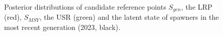 \documentclass[11pt]{book}
\begin{document}
\begin{figure}[htb]

{\centering {} 

}

\caption{Posterior distributions of candidate reference points \(S_{gen}\), the LRP (red), \(S_{MSY}\), the USR (green) and the latent state of spawners in the most recent generation (2023, black).}\label{fig:fig-status}
\end{figure}
\end{document}
